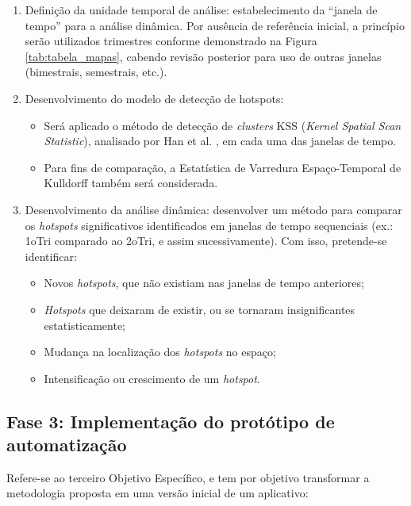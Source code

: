 \begin{enumerate}
  \item{Definição da unidade temporal de análise: estabelecimento da ``janela de tempo'' para a análise dinâmica. Por ausência de referência inicial, a princípio serão utilizados trimestres conforme demonstrado na Figura \ref{tab:tabela_mapas}, cabendo revisão posterior para uso de outras janelas (bimestrais, semestrais, etc.).}
  \item{Desenvolvimento do modelo de detecção de hotspots:}
  \begin{itemize}
    \item{Será aplicado o método de detecção de \textit{clusters} KSS (\textit{Kernel Spatial Scan Statistic}), analisado por Han et al. \cite{Han2019}, em cada uma das janelas de tempo.}
    \item{Para fins de comparação, a Estatística de Varredura Espaço-Temporal de Kulldorff \cite{Kulldorff2005} também será considerada.}
  \end{itemize}
  \item{Desenvolvimento da análise dinâmica: desenvolver um método para comparar os \textit{hotspots} significativos identificados em janelas de tempo sequenciais (ex.: 1oTri comparado ao 2oTri, e assim sucessivamente). Com isso, pretende-se identificar:}
  \begin{itemize}
    \item{Novos \textit{hotspots}, que não existiam nas janelas de tempo anteriores;}
    \item{\textit{Hotspots} que deixaram de existir, ou se tornaram insignificantes estatisticamente;}
    \item{Mudança na localização dos \textit{hotspots} no espaço;}
    \item{Intensificação ou crescimento de um \textit{hotspot}.}
  \end{itemize}
\end{enumerate}

\subsection{Fase 3: Implementação do protótipo de automatização}

Refere-se ao terceiro Objetivo Específico, e tem por objetivo transformar a metodologia proposta em uma versão inicial de um aplicativo:

